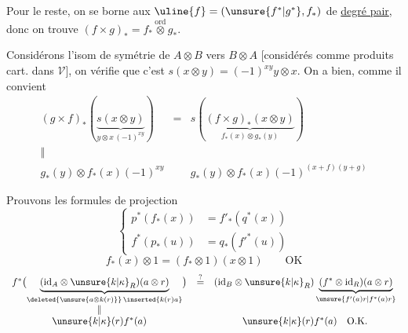 Pour le reste, on se borne aux $\uline{f}=(\unsure{f^*|g^*},f_*)$ de \uline{degré pair}, donc on trouve $(f\times g)_*=f_*\overset{\mathrm{ord}}\otimes g_*$.

Considérons l'isom de symétrie de $A\otimes B$ vers $B\otimes A$ [considérés comme produits cart. dans $\mathcal V$], on vérifie que c'est $s(x\otimes y)=(-1)^{xy}y\otimes x$. On a bien, comme il convient
\[
\begin{array}{ccc}
(g\times f)_*(\underbrace{s(x\otimes y)}_{y\otimes x\,(-1)^{xy}})
&=&s(\underbrace{(f\times g)_*(x\otimes y)}_{f_*(x)\otimes g_*(y)})\\
\Vert&&\\
g_*(y)\otimes f_*(x)(-1)^{xy}&&g_*(y)\otimes f_*(x)(-1)^{(x+f)(y+g)}
\end{array}
\]

Prouvons les formules de projection
\[
\left\{\begin{aligned}
p^*(f_*(x))&=f'_*(q^*(x))\\
f^*(p_*(u))&=q_*(f'^*(u))
\end{aligned}\right.
\]
\[
f_*(x)\otimes1=(f_*\otimes1)(x\otimes1)\qquad\mathrm{OK}
\]
\[
\begin{array}{ccc}
f^*\bigl(\underbrace{(\mathrm{id}_A\otimes\unsure{k|\kappa}_R)(a\otimes r)}_{\deleted{\unsure{a\otimes k(r)}}\,\inserted{k(r)a}}\bigr)
&\overset{?}=&(\mathrm{id}_B\otimes\unsure{k|\kappa}_R)\underbrace{(f^*\otimes\mathrm{id}_R)(a\otimes r)}_{\unsure{f'(a)r|f^*(a)r}}\\
\Vert&&\\
\unsure{k|\kappa}(r)f^*(a)&&\unsure{k|\kappa}(r)f^*(a)\quad\mathrm{O.K.}
\end{array}
\]

